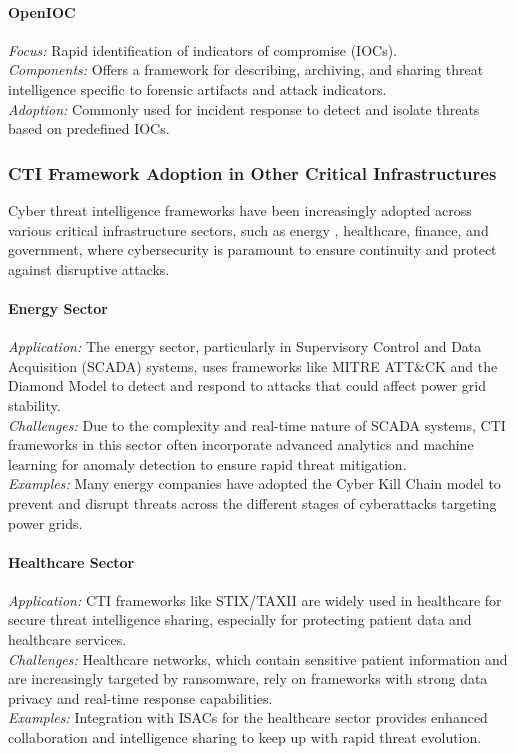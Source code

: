 \documentclass[a4paper,twoside,12pt]{report}
\begin{document}
\paragraph{OpenIOC \citet{janotistrategic}}
\textit{Focus:} Rapid identification of indicators of compromise (IOCs). \\
\textit{Components:} Offers a framework for describing, archiving, and sharing threat intelligence specific to forensic artifacts and attack indicators. \\
\textit{Adoption:} Commonly used for incident response to detect and isolate threats based on predefined IOCs.

\subsubsection*{CTI Framework Adoption in Other Critical Infrastructures \citet{kayode2023applications}}
Cyber threat intelligence frameworks have been increasingly adopted across various critical infrastructure sectors, such as energy \citet{gong2021cyber}, healthcare, finance, and government, where cybersecurity is paramount to ensure continuity and protect against disruptive attacks.

\paragraph{Energy Sector \citet{gong2021cyber}}
\textit{Application:} The energy sector, particularly in Supervisory Control and Data Acquisition (SCADA) systems, uses frameworks like MITRE ATT\&CK and the Diamond Model to detect and respond to attacks that could affect power grid stability. \\
\textit{Challenges:} Due to the complexity and real-time nature of SCADA systems, CTI frameworks in this sector often incorporate advanced analytics and machine learning for anomaly detection to ensure rapid threat mitigation. \\
\textit{Examples:} Many energy companies have adopted the Cyber Kill Chain model to prevent and disrupt threats across the different stages of cyberattacks targeting power grids.

\paragraph{Healthcare Sector \citet{krauss2022analysis}}
\textit{Application:} CTI frameworks like STIX/TAXII are widely used in healthcare for secure threat intelligence sharing, especially for protecting patient data and healthcare services. \\
\textit{Challenges:} Healthcare networks, which contain sensitive patient information and are increasingly targeted by ransomware, rely on frameworks with strong data privacy and real-time response capabilities. \\
\textit{Examples:} Integration with ISACs \citet{bugiardini2016international} for the healthcare sector provides enhanced collaboration and intelligence sharing to keep up with rapid threat evolution.
\end{document}

